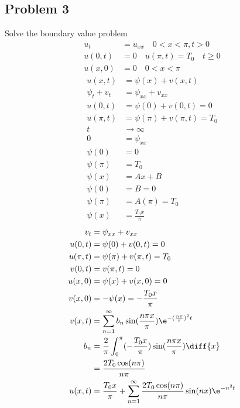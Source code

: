 \documentclass{math}
\begin{document}
\subsection*{Problem 3}
Solve the boundary value problem
\begin{align*}
  u_t &= u_{xx} \quad 0<x<\pi,t>0 \\
  u(0,t) &= 0 \quad u(\pi,t) = T_0 \quad t\ge 0 \\
  u(x,0) &= 0 \quad 0<x<\pi
\end{align*}
\begin{align*}
  u(x,t) &= \psi(x)+v(x,t) \\
  \psi_t+v_t &= \psi_{xx}+v_{xx} \\
  u(0,t) &= \psi(0)+v(0,t) = 0 \\
  u(\pi,t) &= \psi(\pi)+v(\pi,t) = T_0 \\
  t &\to \infty \\
  0 &= \psi_{xx} \\
  \psi(0) &= 0 \\
  \psi(\pi) &= T_0 \\
  \psi(x) &= Ax+B \\
  \psi(0) &= B = 0 \\
  \psi(\pi) &= A(\pi) = T_0 \\
  \psi(x) &= \frac{T_0x}{\pi}
\end{align*}
\begin{align*}
  v_t &= \psi_{xx}+v_{xx} \\
  u(0,t) &= \psi(0)+v(0,t) = 0 \\
  u(\pi,t) &= \psi(\pi)+v(\pi,t) = T_0 \\
  v(0,t) &= v(\pi,t) = 0 \\
  u(x,0) &= \psi(x)+v(x,0) = 0 \\
  v(x,0) &= -\psi(x) = -\frac{T_0x}{\pi} \\
  v(x,t) &= \sum_{n=1}^{\infty}
    b_n\sin(\frac{n\pi x}{\pi})\e^{-(\frac{n\pi}{\pi})^2t} \\
  b_n &= \frac{2}{\pi}\int_{0}^{\pi}(-\frac{T_0x}{\pi})
    \sin(\frac{n\pi x}{\pi})\diff{x} \\
  &= \frac{2T_0\cos(n\pi)}{n\pi} \\
  u(x,t) &= \frac{T_0x}{\pi}+\sum_{n=1}^{\infty}
    \frac{2T_0\cos(n\pi)}{n\pi}\sin(nx)\e^{-n^2t}
\end{align*}
\end{document}
